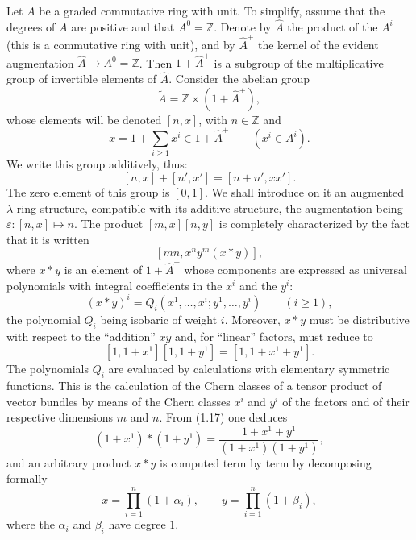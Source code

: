 \documentclass[11pt]{article}
\providecommand{\Z}{\mathbb Z}
\providecommand{\Ahat}{\widehat A}
\providecommand{\Ahp}{\widehat A^{+}}
\begin{document}
Let $A$ be a graded commutative ring with unit. To simplify, assume that the degrees of $A$ are positive and that $A^0=\Z$. Denote by $\Ahat$ the product of the $A^i$ (this is a commutative ring with unit), and by $\Ahp$ the kernel of the evident augmentation $\Ahat\to A^0=\Z$. Then $1+\Ahp$ is a subgroup of the multiplicative group of invertible elements of $\Ahat$. Consider the abelian group
\begin{equation}\tag{1.14}
\widetilde A=\Z\times (1+\Ahp),
\end{equation}
whose elements will be denoted $[n,x]$, with $n\in\Z$ and
\[
x=1+\sum_{i\geq 1}x^i\in 1+\Ahp\qquad (x^i\in A^i).
\]
We write this group additively, thus:
\begin{equation}\tag{1.15}
[n,x]+[n',x']=[n+n',xx'].
\end{equation}
The zero element of this group is $[0,1]$. We shall introduce on it an augmented $\lambda$-ring structure, compatible with its additive structure, the augmentation being $\varepsilon:[n,x]\mapsto n$. The product $[m,x][n,y]$ is completely characterized by the fact that it is written
\[
[mn,x^n y^m(x*y)],
\]
where $x*y$ is an element of $1+\Ahp$ whose components are expressed as universal polynomials with integral coefficients in the $x^i$ and the $y^i$:
\begin{equation}\tag{1.16}
(x*y)^i=Q_i(x^1,\ldots,x^i;y^1,\ldots,y^i)\qquad (i\geq 1),
\end{equation}
the polynomial $Q_i$ being isobaric of weight $i$. Moreover, $x*y$ must be distributive with respect to the ``addition'' $xy$ and, for ``linear'' factors, must reduce to
\begin{equation}\tag{1.17}
[1,1+x^1][1,1+y^1]=[1,1+x^1+y^1].
\end{equation}
The polynomials $Q_i$ are evaluated by calculations with elementary symmetric functions. This is the calculation of the Chern classes of a tensor product of vector bundles by means of the Chern classes $x^i$ and $y^i$ of the factors and of their respective dimensions $m$ and $n$. From (1.17) one deduces
\begin{equation}\tag{1.17 bis}
(1+x^1)*(1+y^1)=\frac{1+x^1+y^1}{(1+x^1)(1+y^1)},
\end{equation}
and an arbitrary product $x*y$ is computed term by term by decomposing formally
\[
x=\prod_{i=1}^n(1+\alpha_i),\qquad y=\prod_{i=1}^n(1+\beta_i),
\]
where the $\alpha_i$ and $\beta_i$ have degree $1$.
\end{document}
